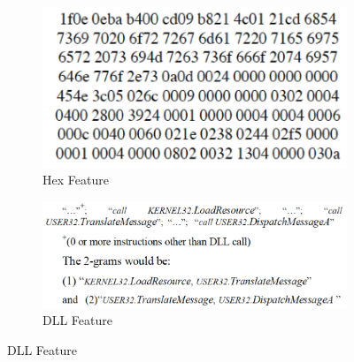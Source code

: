 \documentclass[11pt]{article}
\begin{document}
\begin{figure}[htbp]
\centering
\begin{subfigure}[htbp]{0.4\columnwidth}
\includegraphics*[width=\textwidth]{fig/hex}
\caption{Hex Feature}
\label{fig:hex}
\end{subfigure}
\hfill
\begin{subfigure}[htbp]{0.57\columnwidth}
\includegraphics*[width=\textwidth]{fig/DLL}
\caption{DLL Feature}
\label{fig:DLL}
\end{subfigure}
\label{fig:hexDLL}
\end{figure}




\end{document}
